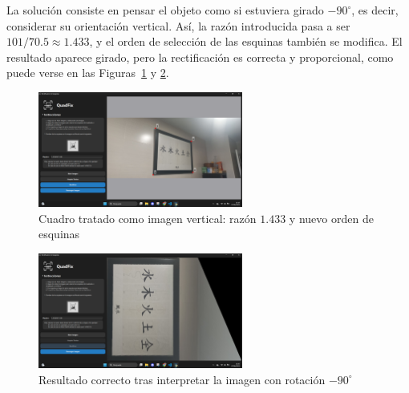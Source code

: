 La solución consiste en pensar el objeto como si estuviera girado $-90^\circ$, es decir, considerar su orientación vertical. Así, la razón introducida pasa a ser $101 / 70.5 \approx 1.433$, y el orden de selección de las esquinas también se modifica. El resultado aparece girado, pero la rectificación es correcta y proporcional, como puede verse en las Figuras~\ref{fg:cuadro-corregido-1} y \ref{fg:cuadro-corregido-2}.

\begin{figure}[H]
    \centering
    \includegraphics[width=0.6\textwidth]{figures/4.Examples/Especial/Cuadro1.png}
    \caption{Cuadro tratado como imagen vertical: razón $1.433$ y nuevo orden de esquinas}
    \label{fg:cuadro-corregido-1}
\end{figure}

\begin{figure}[H]
    \centering
    \includegraphics[width=0.6\textwidth]{figures/4.Examples/Especial/Cuadro2.png}
    \caption{Resultado correcto tras interpretar la imagen con rotación $-90^\circ$}
    \label{fg:cuadro-corregido-2}
\end{figure}
